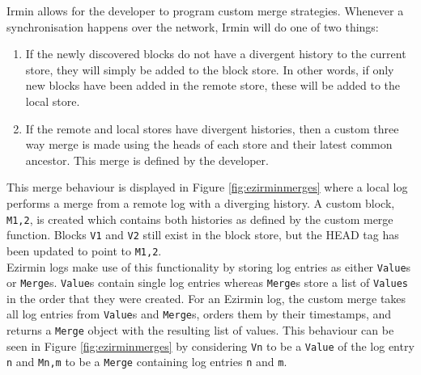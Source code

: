 \documentclass[12pt,a4paper,twoside,openright]{report}
\begin{document}
	Irmin allows for the developer to program custom merge strategies. 
	Whenever a synchronisation happens over the network, Irmin will do one of two things:
	\begin{enumerate}
		\item If the newly discovered blocks do not have a divergent history to the current store, they will simply be added to the block store. 
			In other words, if only new blocks have been added in the remote store, these will be added to the local store. 
		\item If the remote and local stores have divergent histories, then a custom three way merge is made using the heads of each store and their latest common ancestor.
		This merge is defined by the developer.
	\end{enumerate}
	This merge behaviour is displayed in Figure \ref{fig:ezirminmerges} where a local log performs a merge from a remote log with a diverging history.
	A custom block, \texttt{M1,2}, is created which contains both histories as defined by the custom merge function. 
	Blocks \texttt{V1} and \texttt{V2} still exist in the block store, but the HEAD tag has been updated to point to \texttt{M1,2}. \\

	Ezirmin logs make use of this functionality by storing log entries as either \texttt{Value}s or \texttt{Merge}s.
	\texttt{Value}s contain single log entries whereas \texttt{Merge}s store a list of \texttt{Values} in the order that they were created. 
	For an Ezirmin log, the custom merge takes all log entries from \texttt{Value}s and \texttt{Merge}s, orders them by their timestamps, and returns a \texttt{Merge} object with the resulting list of values. 
	This behaviour can be seen in Figure \ref{fig:ezirminmerges} by considering \texttt{Vn} to be a \texttt{Value} of the log entry \texttt{n} and \texttt{Mn,m} to be a \texttt{Merge} containing log entries \texttt{n} and \texttt{m}. 
\end{document}
